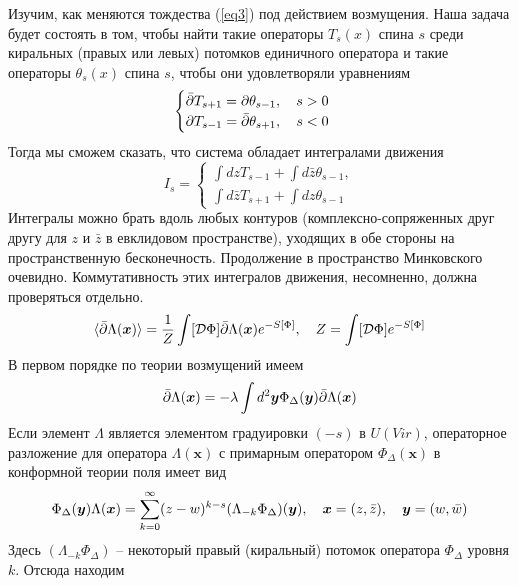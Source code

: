 \documentclass[12pt]{article}
\theoremstyle{definition}
\begin{document}
Изучим, как меняются тождества (\ref{eq3}) под действием возмущения. Наша задача будет состоять в том, чтобы найти такие операторы $T_s(x)$ спина $s$ среди киральных (правых или левых) потомков единичного оператора и такие операторы $\theta_s(x)$ спина $s$, чтобы они удовлетворяли уравнениям
\begin{equation}\label{eq9}
    \begin{cases}
        \Bar{\partial}T_{s+1}=\partial\theta_{s-1},\quad s>0\\
        \partial T_{s-1}=\Bar{\partial}\theta_{s+1},\quad s<0
    \end{cases}
\end{equation}
Тогда мы сможем сказать, что система обладает интегралами движения
\begin{equation}
    I_s=\begin{cases}
        \int dzT_{s-1}+\int d\bar{z}\theta_{s-1},\\
        \int d\bar{z}T_{s+1}+\int dz\theta_{s-1}
    \end{cases}
\end{equation}
Интегралы можно брать вдоль любых контуров (комплексно-сопряженных друг другу для $z$ и $\bar{z}$ в евклидовом пространстве), уходящих в обе стороны на пространственную бесконечность. Продолжение в пространство Минковского очевидно. Коммутативность этих интегралов движения, несомненно, должна проверяться отдельно.
\begin{equation}
    \braket{\Bar{\partial}\Lambda(\bm{x})}=\frac{1}{Z}\int[\mathcal{D}\Phi]\Bar{\partial}\Lambda(\bm{x})e^{-S[\Phi]},\quad Z=\int[\mathcal{D}\Phi]e^{-S[\Phi]}
\end{equation}
В первом порядке по теории возмущений имеем
\begin{equation}\label{eq4}
    \Bar{\partial}\Lambda(\bm{x})=-\lambda\int d^2\bm{y}\Phi_\Delta(\bm{y})\Bar{\partial}\Lambda(\bm{x})
\end{equation}
Если элемент $\Lambda$ является элементом градуировки $(-s)$ в $U(Vir)$, операторное разложение для оператора $\Lambda(\bm{x})$ с примарным оператором $\Phi_\Delta(\bm{x})$ в конформной теории поля имеет вид
\begin{equation}\label{eq5}
    \Phi_\Delta(\bm{y})\Lambda(\bm{x})=\sum\limits_{k=0}^\infty(z-w)^{k-s}(\Lambda_{-k}\Phi_\Delta)(\bm{y}),\quad \bm{x}=(z,\bar{z}),\quad \bm{y}=(w,\Bar{w})
\end{equation}
Здесь $(\Lambda_{-k}\Phi_\Delta)$ -- некоторый правый (киральный) потомок оператора $\Phi_\Delta$ уровня $k$. Отсюда находим
\end{document}
